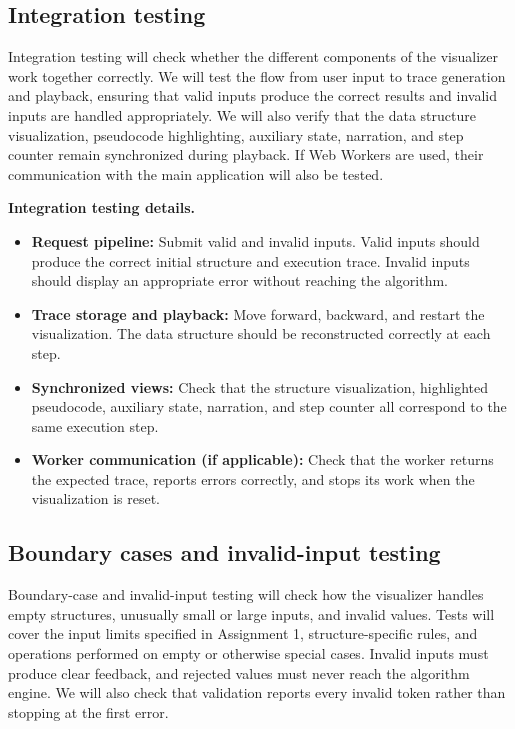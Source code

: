 \documentclass[11pt,a4paper]{article}
\begin{document}
\subsection{Integration testing}

Integration testing will check whether the different components of the visualizer work together correctly. We will test the flow from user input to trace generation and playback, ensuring that valid inputs produce the correct results and invalid inputs are handled appropriately. We will also verify that the data structure visualization, pseudocode highlighting, auxiliary state, narration, and step counter remain synchronized during playback. If Web Workers are used, their communication with the main application will also be tested. 


\noindent\textbf{Integration testing details.}
\begin{itemize}
    \item \textbf{Request pipeline:} Submit valid and invalid inputs.
    Valid inputs should produce the correct initial structure and execution
    trace. Invalid inputs should display an appropriate error without
    reaching the algorithm.

    \item \textbf{Trace storage and playback:} Move forward, backward,
    and restart the visualization. The data structure should be
    reconstructed correctly at each step.

    \item \textbf{Synchronized views:} Check that the structure
    visualization, highlighted pseudocode, auxiliary state, narration,
    and step counter all correspond to the same execution step.

    \item \textbf{Worker communication (if applicable):} Check that the
    worker returns the expected trace, reports errors correctly, and
    stops its work when the visualization is reset.
\end{itemize}




\subsection{Boundary cases and invalid-input testing}

Boundary-case and invalid-input testing will check how the visualizer handles empty structures, unusually small or large inputs, and invalid values. Tests will cover the input limits specified in Assignment 1, structure-specific rules, and operations performed on empty or otherwise special cases. Invalid inputs must produce clear feedback, and rejected values must never reach the algorithm engine. We will also check that validation reports every invalid token rather than stopping at the first error. 
\end{document}
